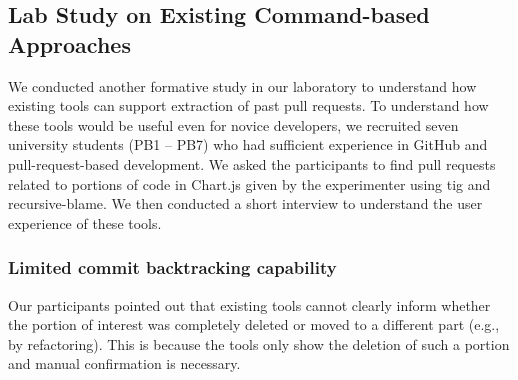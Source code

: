 \subsection{Lab Study on Existing Command-based Approaches}

We conducted another formative study in our laboratory to understand how existing tools can support extraction of past pull requests.
To understand how these tools would be useful even for novice developers, we recruited seven university students (PB1 -- PB7) who had sufficient experience in GitHub and pull-request-based development.
We asked the participants to find pull requests related to portions of code in Chart.js given by the experimenter using tig and recursive-blame.
We then conducted a short interview to understand the user experience of these tools.


\subsubsection{Limited commit backtracking capability}





Our participants pointed out that existing tools cannot clearly inform whether the portion of interest was completely deleted or moved to a different part (e.g., by refactoring).
This is because the tools only show the deletion of such a portion and manual confirmation is necessary.


